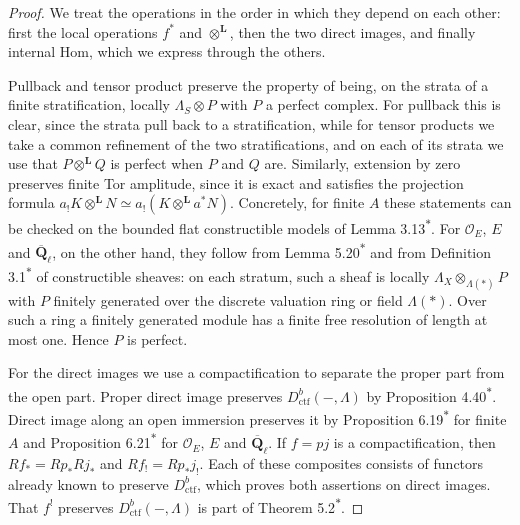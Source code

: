 \documentclass[11pt]{article}
\newcommand{\bpout}[1]{#1\textsuperscript{\hyperlink{bp-outside}{\ensuremath{\ast}}}}
\begin{document}
\begin{proof}[{Proof}]\label{bp6}%
We treat the operations in the order in which they depend on each other: first the local operations \(f^*\) and \(\otimes^{\mathbf L}\), then the two direct images, and finally internal Hom, which we express through the others.

Pullback and tensor product preserve the property of being, on the strata of a finite stratification, locally \(\Lambda_S\otimes P\) with \(P\) a perfect complex. For pullback this is clear, since the strata pull back to a stratification, while for tensor products we take a common refinement of the two stratifications, and on each of its strata we use that \(P\otimes^{\mathbf L}Q\) is perfect when \(P\) and \(Q\) are. Similarly, extension by zero preserves finite Tor amplitude, since it is exact and satisfies the projection formula \(a_!K\otimes^{\mathbf L}N\simeq a_!(K\otimes^{\mathbf L}a^*N)\). Concretely, for finite \(A\) these statements can be checked on the bounded flat constructible models of Lemma \bpout{3.13}. For \(\mathcal O_E\), \(E\) and \(\overline{\mathbf Q}_\ell\), on the other hand, they follow from Lemma \bpout{5.20} and from Definition \bpout{3.1} of constructible sheaves: on each stratum, such a sheaf is locally \(\Lambda_X\otimes_{\Lambda(*)}P\) with \(P\) finitely generated over the discrete valuation ring or field \(\Lambda(*)\). Over such a ring a finitely generated module has a finite free resolution of length at most one. Hence \(P\) is perfect.

For the direct images we use a compactification to separate the proper part from the open part. Proper direct image preserves \(D^b_{\mathrm{ctf}}(-,\Lambda)\) by Proposition \bpout{4.40}. Direct image along an open immersion preserves it by Proposition \bpout{6.19} for finite \(A\) and Proposition \bpout{6.21} for \(\mathcal O_E\), \(E\) and \(\overline{\mathbf Q}_\ell\). If \(f=pj\) is a compactification, then \(Rf_*=Rp_*Rj_*\) and \(Rf_!=Rp_*j_!\). Each of these composites consists of functors already known to preserve \(D^b_{\mathrm{ctf}}\), which proves both assertions on direct images. That \(f^!\) preserves \(D^b_{\mathrm{ctf}}(-,\Lambda)\) is part of Theorem \bpout{5.2}.


\end{proof}
\end{document}
